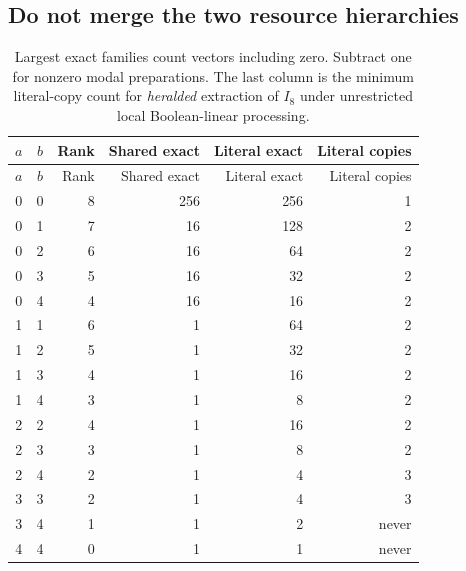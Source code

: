 \documentclass[11pt,a4paper]{article}
\theoremstyle{definition}\newtheorem{definition}[theorem]{Definition}
\begin{document}
\subsection{Do not merge the two resource hierarchies}
\begin{longtable}{@{}ccrrrr@{}}
\caption{Largest exact families count vectors including zero. Subtract one for nonzero modal preparations. The last column is the minimum literal-copy count for \emph{heralded} extraction of $I_8$ under unrestricted local Boolean-linear processing.}\label{tab:hierarchy}\\
\toprule $a$ & $b$ & Rank & Shared exact & Literal exact & Literal copies\\\midrule\endfirsthead
\toprule $a$ & $b$ & Rank & Shared exact & Literal exact & Literal copies\\\midrule\endhead
0 & 0 & 8 & 256 & 256 & 1\\
0 & 1 & 7 & 16 & 128 & 2\\
0 & 2 & 6 & 16 & 64 & 2\\
0 & 3 & 5 & 16 & 32 & 2\\
0 & 4 & 4 & 16 & 16 & 2\\
1 & 1 & 6 & 1 & 64 & 2\\
1 & 2 & 5 & 1 & 32 & 2\\
1 & 3 & 4 & 1 & 16 & 2\\
1 & 4 & 3 & 1 & 8 & 2\\
2 & 2 & 4 & 1 & 16 & 2\\
2 & 3 & 3 & 1 & 8 & 2\\
2 & 4 & 2 & 1 & 4 & 3\\
3 & 3 & 2 & 1 & 4 & 3\\
3 & 4 & 1 & 1 & 2 & never\\
4 & 4 & 0 & 1 & 1 & never\\
\bottomrule\end{longtable}
\end{document}
